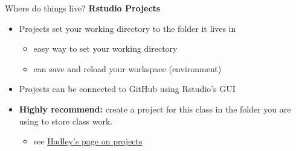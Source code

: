 \documentclass[
  ignorenonframetext,
]{beamer}
\providecommand{\tightlist}{%
  \setlength{\itemsep}{0pt}\setlength{\parskip}{0pt}}
\begin{document}
\begin{frame}{Where do things live? \textbar{} \textbf{Rstudio
Projects}}
\protect\hypertarget{where-do-things-live-rstudio-projects}{}
\begin{itemize}[<+->]
\tightlist
\item
  Projects set your working directory to the folder it lives in

  \begin{itemize}[<+->]
  \tightlist
  \item
    easy way to set your working directory
  \item
    can save and reload your workspace (environment)
  \end{itemize}
\item
  Projects can be connected to GitHub using Rstudio's GUI
\item
  \textbf{Highly recommend:} create a project for this class in the
  folder you are using to store class work.

  \begin{itemize}[<+->]
  \tightlist
  \item
    see \href{http://r4ds.had.co.nz/workflow-projects.html}{Hadley's
    page on projects}
  \end{itemize}
\end{itemize}
\end{frame}
\end{document}

